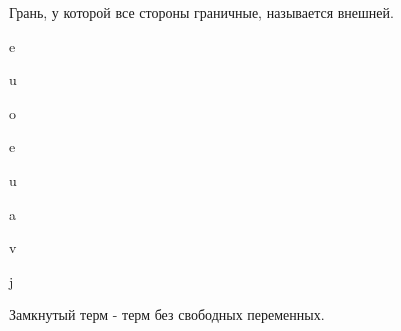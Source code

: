 \documentclass[17pt, a4paper]{extarticle}
\begin{document}
\begin{define}
Грань, у которой все стороны граничные, называется внешней.

e

u

o

e

u

a

v

j
\end{define}

\begin{define}
Замкнутый терм - терм без свободных переменных.

\end{define}
\end{document}
